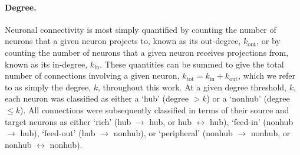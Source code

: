 \documentclass[10pt,letterpaper]{article}
\begin{document}
\paragraph{Degree.}
Neuronal connectivity is most simply quantified by counting the number of neurons that a given neuron projects to, known as its out-degree, $k_\mathrm{out}$, or by counting the number of neurons that a given neuron receives projections from, known as its in-degree, $k_\mathrm{in}$.
These quantities can be summed to give the total number of connections involving a given neuron, $k_\mathrm{tot} = k_\mathrm{in} + k_\mathrm{out}$, which we refer to as simply the degree, $k$, throughout this work.
At a given degree threshold, $k$, each neuron was classified as either a `hub' (degree $>k$) or a `nonhub' (degree $\leq k$).
All connections were subsequently classified in terms of their source and target neurons as either
`rich' (hub $\rightarrow$ hub, or hub $\leftrightarrow$ hub),
`feed-in' (nonhub $\rightarrow$ hub),
`feed-out' (hub $\rightarrow$ nonhub),
or `peripheral' (nonhub $\rightarrow$ nonhub, or nonhub $\leftrightarrow$ nonhub).
\end{document}
